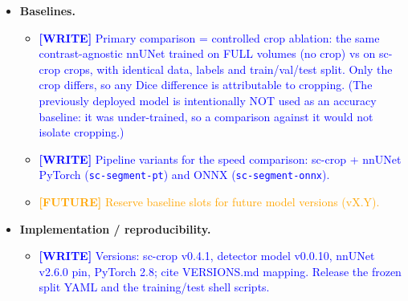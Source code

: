 \documentclass[11pt]{article}
\newcommand{\WRITE}[1]{\textcolor{blue}{\textbf{[WRITE]} #1}}
\newcommand{\FUTURE}[1]{\textcolor{orange}{\textbf{[FUTURE]} #1}}
\begin{document}
\begin{itemize}
\begin{itemize}
{            (recall of cord coverage, bbox IoU) — optional.}
    \end{itemize}
  \item \textbf{Baselines.}
    \begin{itemize}
      \item \WRITE{Primary comparison = controlled crop ablation: the same
            contrast-agnostic nnUNet trained on FULL volumes (no crop) vs on
            sc-crop crops, with identical data, labels and train/val/test split.
            Only the crop differs, so any Dice difference is attributable to
            cropping. (The previously deployed model is intentionally NOT used as
            an accuracy baseline: it was under-trained, so a comparison against it
            would not isolate cropping.)}
      \item \WRITE{Pipeline variants for the speed comparison: sc-crop + nnUNet
            PyTorch (\texttt{sc-segment-pt}) and ONNX (\texttt{sc-segment-onnx}).}
      \item \FUTURE{Reserve baseline slots for future model versions (vX.Y).}
    \end{itemize}
  \item \textbf{Implementation / reproducibility.}
    \begin{itemize}
      \item \WRITE{Versions: sc-crop v0.4.1, detector model v0.0.10, nnUNet
            v2.6.0 pin, PyTorch 2.8; cite VERSIONS.md mapping. Release the
            frozen split YAML and the training/test shell scripts.}
    \end{itemize}
\end{itemize}

\end{document}
